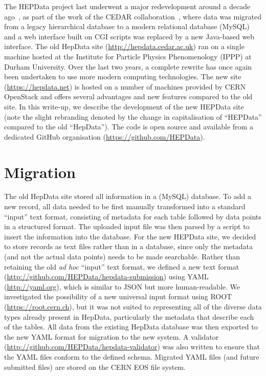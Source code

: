 \documentclass[a4paper]{jpconf}
\begin{document}
The HEPData project last underwent a major redevelopment around a decade ago~\cite{Buckley:2010jn}, as part of the work of the CEDAR collaboration~\cite{Buckley:2007hi}, where data was migrated from a legacy hierarchical database to a modern relational database (MySQL) and a web interface built on CGI scripts was replaced by a new Java-based web interface.  The old HepData site (\url{http://hepdata.cedar.ac.uk}) ran on a single machine hosted at the Institute for Particle Physics Phenomenology (IPPP) at Durham University.  Over the last two years, a complete rewrite has once again been undertaken to use more modern computing technologies.  The new site (\url{https://hepdata.net}) is hosted on a number of machines provided by CERN OpenStack and offers several advantages and new features compared to the old site.  In this write-up, we describe the development of the new HEPData site (note the slight rebranding denoted by the change in capitalisation of ``HEPData'' compared to the old ``HepData'').  The code is open source and available from a dedicated GitHub organisation (\url{https://github.com/HEPData}).

\section{Migration}

The old HepData site stored all information in a (MySQL) database.  To add a new record, all data needed to be first manually transformed into a standard ``input'' text format, consisting of metadata for each table followed by data points in a structured format.  The uploaded input file was then parsed by a script to insert the information into the database.  For the new HEPData site, we decided to store records as text files rather than in a database, since only the metadata (and not the actual data points) needs to be made searchable.  Rather than retaining the old \emph{ad hoc} ``input'' text format, we defined a new text format (\url{http://github.com/HEPData/hepdata-submission}) using YAML (\url{http://yaml.org}), which is similar to JSON but more human-readable.  We investigated the possibility of a new universal input format using ROOT (\url{https://root.cern.ch}), but it was not suited to representing all of the diverse data types already present in HepData, particularly the metadata that describe each of the tables.  All data from the existing HepData database was then exported to the new YAML format for migration to the new system.  A validator (\url{http://github.com/HEPData/hepdata-validator}) was also written to ensure that the YAML files conform to the defined schema.  Migrated YAML files (and future submitted files) are stored on the CERN EOS file system.
\end{document}
